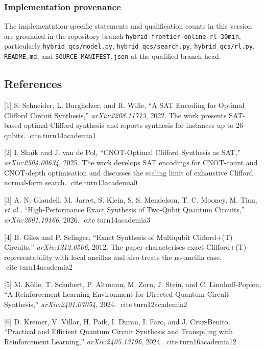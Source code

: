 \documentclass[
]{article}
\begin{document}
\hypertarget{implementation-provenance}{%
\subsubsection{Implementation
provenance}\label{implementation-provenance}}

The implementation-specific statements and qualification counts in this
version are grounded in the repository branch
\texttt{hybrid-frontier-online-rl-30min}, particularly
\texttt{hybrid\_qcs/model.py}, \texttt{hybrid\_qcs/search.py},
\texttt{hybrid\_qcs/rl.py}, \texttt{README.md}, and
\texttt{SOURCE\_MANIFEST.json} at the qualified branch head.

\hypertarget{references}{%
\subsection{References}\label{references}}

{[}1{]} S. Schneider, L. Burgholzer, and R. Wille, ``A SAT Encoding for
Optimal Clifford Circuit Synthesis,'' \emph{arXiv:2208.11713}, 2022. The
work presents SAT-based optimal Clifford synthesis and reports synthesis
for instances up to 26 qubits. citeturn14academia1

{[}2{]} I. Shaik and J. van de Pol, ``CNOT-Optimal Clifford Synthesis as
SAT,'' \emph{arXiv:2504.00634}, 2025. The work develops SAT encodings
for CNOT-count and CNOT-depth optimisation and discusses the scaling
limit of exhaustive Clifford normal-form search. citeturn13academia0

{[}3{]} A. N. Glaudell, M. Jarret, S. Klein, S. S. Mendelson, T. C.
Mooney, M. Tian, \emph{et al.}, ``High-Performance Exact Synthesis of
Two-Qubit Quantum Circuits,'' \emph{arXiv:2601.19166}, 2026.
citeturn14academia3

{[}4{]} B. Giles and P. Selinger, ``Exact Synthesis of Multiqubit
Clifford+(T) Circuits,'' \emph{arXiv:1212.0506}, 2012. The paper
characterises exact Clifford+(T) representability with local ancillas
and also treats the no-ancilla case. citeturn14academia2

{[}5{]} M. Kölle, T. Schubert, P. Altmann, M. Zorn, J. Stein, and C.
Linnhoff-Popien, ``A Reinforcement Learning Environment for Directed
Quantum Circuit Synthesis,'' \emph{arXiv:2401.07054}, 2024.
citeturn12academia2

{[}6{]} D. Kremer, V. Villar, H. Paik, I. Duran, I. Faro, and J.
Cruz-Benito, ``Practical and Efficient Quantum Circuit Synthesis and
Transpiling with Reinforcement Learning,'' \emph{arXiv:2405.13196},
2024. citeturn16academia12
\end{document}
